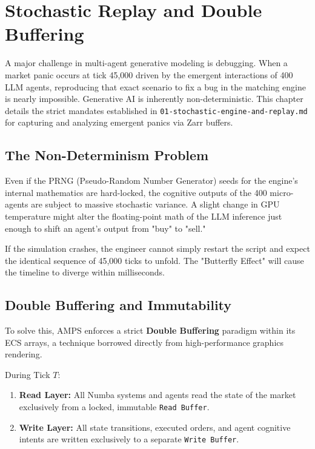 \chapter{Stochastic Replay and Double Buffering}
\label{ch:stochastic_replay}

A major challenge in multi-agent generative modeling is debugging. When a market panic occurs at tick 45,000 driven by the emergent interactions of 400 LLM agents, reproducing that exact scenario to fix a bug in the matching engine is nearly impossible. Generative AI is inherently non-deterministic. This chapter details the strict mandates established in \texttt{01-stochastic-engine-and-replay.md} for capturing and analyzing emergent panics via Zarr buffers.

\section{The Non-Determinism Problem}

Even if the PRNG (Pseudo-Random Number Generator) seeds for the engine's internal mathematics are hard-locked, the cognitive outputs of the 400 micro-agents are subject to massive stochastic variance. A slight change in GPU temperature might alter the floating-point math of the LLM inference just enough to shift an agent's output from "buy" to "sell."

If the simulation crashes, the engineer cannot simply restart the script and expect the identical sequence of 45,000 ticks to unfold. The "Butterfly Effect" will cause the timeline to diverge within milliseconds. 

\section{Double Buffering and Immutability}

To solve this, AMPS enforces a strict \textbf{Double Buffering} paradigm within its ECS arrays, a technique borrowed directly from high-performance graphics rendering.

During Tick $T$:
\begin{enumerate}
    \item \textbf{Read Layer:} All Numba systems and agents read the state of the market exclusively from a locked, immutable \texttt{Read Buffer}.
    \item \textbf{Write Layer:} All state transitions, executed orders, and agent cognitive intents are written exclusively to a separate \texttt{Write Buffer}.
\end{enumerate}

